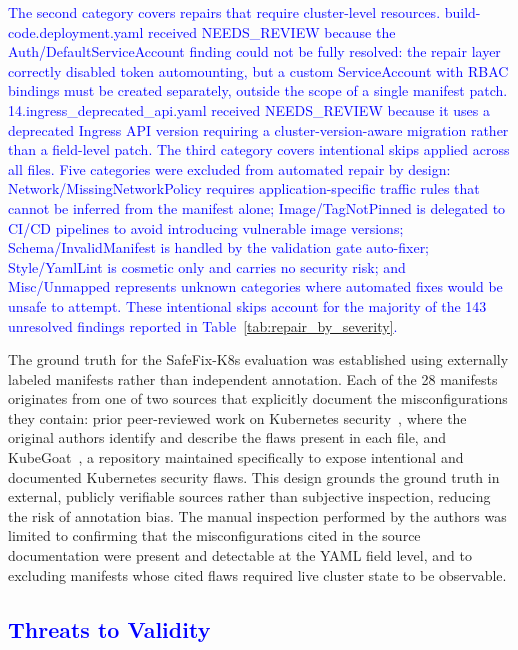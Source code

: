 \documentclass[preprint,12pt]{elsarticle}
\newcommand{\new}[1]{\textcolor{blue}{#1}}
\begin{document}
\new{
The second category covers repairs that require cluster-level 
resources. build-code.deployment.yaml received NEEDS\_REVIEW because 
the Auth/DefaultServiceAccount finding could not be fully resolved: 
the repair layer correctly disabled token automounting, but a custom 
ServiceAccount with RBAC bindings must be created separately, outside 
the scope of a single manifest patch. 14.ingress\_deprecated\_api.yaml 
received NEEDS\_REVIEW because it uses a deprecated Ingress API version 
requiring a cluster-version-aware migration rather than a field-level 
patch.}
\new{
The third category covers intentional skips applied across all files. 
Five categories were excluded from automated repair by design: 
Network/MissingNetworkPolicy requires application-specific traffic 
rules that cannot be inferred from the manifest alone; 
Image/TagNotPinned is delegated to CI/CD pipelines to avoid 
introducing vulnerable image versions; Schema/InvalidManifest is 
handled by the validation gate auto-fixer; Style/YamlLint is 
cosmetic only and carries no security risk; and Misc/Unmapped 
represents unknown categories where automated fixes would be unsafe 
to attempt. These intentional skips account for the majority of 
the 143 unresolved findings reported in 
Table~\ref{tab:repair_by_severity}. }

The ground truth for the SafeFix-K8s evaluation was established using
externally labeled manifests rather than independent annotation. Each
of the 28 manifests originates from one of two sources that explicitly
document the misconfigurations they contain: prior peer-reviewed work
on Kubernetes security~\cite{malul2024genkubesec,ye2025llmsecconfig,shamim2024technoeducational,dellimmagine2023kubehound},
where the original authors identify and describe the flaws present in
each file, and KubeGoat~\cite{madhuakula_kubernetes_goat}, a
repository maintained specifically to expose intentional and
documented Kubernetes security flaws. This design grounds the ground
truth in external, publicly verifiable sources rather than subjective
inspection, reducing the risk of annotation bias. The manual
inspection performed by the authors was limited to confirming that
the misconfigurations cited in the source documentation were present
and detectable at the YAML field level, and to excluding manifests
whose cited flaws required live cluster state to be observable.






\new{\section{Threats to Validity}}
\label{sec:threats}
\end{document}
